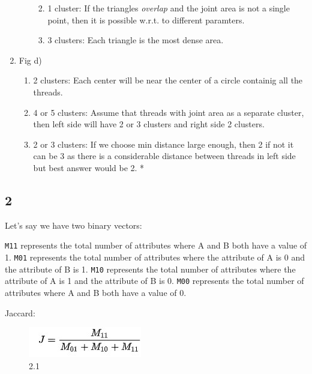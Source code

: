 \documentclass[11pt]{article}
\makeatletter
\def\maxwidth{\ifdim\Gin@nat@width>\linewidth\linewidth
    \else\Gin@nat@width\fi}
\let\Oldincludegraphics\includegraphics
\renewcommand{\includegraphics}[1]{\Oldincludegraphics[width=.8\maxwidth]{#1}}
\providecommand{\tightlist}{%
      \setlength{\itemsep}{0pt}\setlength{\parskip}{0pt}}
\makeatother
\begin{document}
\begin{enumerate}
\begin{enumerate}
    \begin{enumerate}
    \def\labelenumiii{\arabic{enumiii}.}
    \tightlist
    \item
      1 cluster: If the triangles \emph{overlap} and the joint area is
      not a single point, then it is possible w.r.t. to different
      paramters.
    \item
      3 clusters: Each triangle is the most dense area.
    \end{enumerate}
  \end{enumerate}
\item
  Fig d)

  \begin{enumerate}
  \def\labelenumii{\arabic{enumii}.}
  \tightlist
  \item
    2 clusters: Each center will be near the center of a circle
    containig all the threads.
  \item
    4 or 5 clusters: Assume that threads with joint area as a separate
    cluster, then left side will have 2 or 3 clusters and right side 2
    clusters.
  \item
    2 or 3 clusters: If we choose min distance large enough, then 2 if
    not it can be 3 as there is a considerable distance between threads
    in left side but best answer would be 2. *
  \end{enumerate}
\end{enumerate}

    \hypertarget{section}{%
\subsection{2}\label{section}}

Let's say we have two binary vectors:

\texttt{M11} represents the total number of attributes where A and B
both have a value of 1. \texttt{M01} represents the total number of
attributes where the attribute of A is 0 and the attribute of B is 1.
\texttt{M10} represents the total number of attributes where the
attribute of A is 1 and the attribute of B is 0. \texttt{M00} represents
the total number of attributes where A and B both have a value of 0.

Jaccard:

\begin{figure}
\centering
\includegraphics{wiki/2.1.jpg}
\caption{2.1}
\end{figure}
\end{document}
